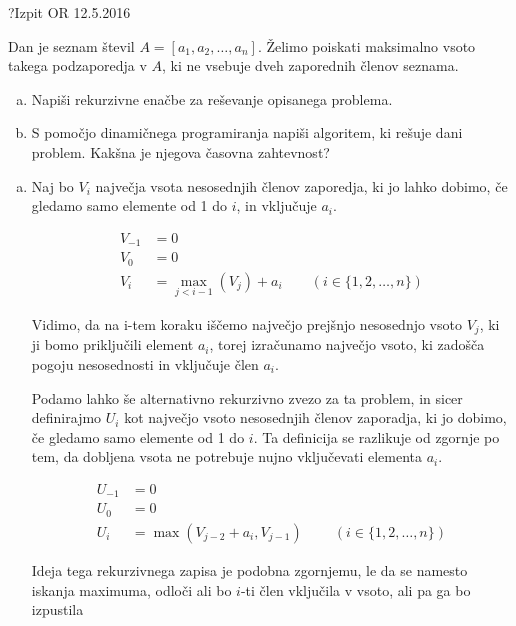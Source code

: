 \begin{naloga}{?}{Izpit OR 12.5.2016}
\begin{vprasanje}
Dan je seznam števil $A = [a_1, a_2, \dots, a_n]$.
Želimo poiskati maksimalno vsoto takega podzaporedja v $A$,
ki ne vsebuje dveh zaporednih členov seznama.

\begin{enumerate}[(a)]
\item Napiši rekurzivne enačbe za reševanje opisanega problema.

\item S pomočjo dinamičnega programiranja napiši algoritem,
ki rešuje dani problem.
Kakšna je njegova časovna zahtevnost?
\end{enumerate}
\end{vprasanje}
\begin{odgovor}

\begin{enumerate}[(a)]

\item Naj bo $V_i$ največja vsota nesosednjih členov zaporedja, ki jo lahko dobimo,
če gledamo samo elemente od 1 do $i$, in vključuje $a_i$.

\begin{align*}
V_{-1} &= 0 \\
V_0 &= 0 \\
V_i &= \max_{j < i - 1}\left(V_j\right) + a_i
\qquad (i \in \{1, 2, \dots, n\})
\end{align*}

Vidimo, da na i-tem koraku iščemo največjo prejšnjo nesosednjo vsoto $V_j$, 
ki ji bomo priključili element $a_i$, torej izračunamo največjo vsoto, 
ki zadošča pogoju nesosednosti in vključuje člen $a_i$.

Podamo lahko še alternativno rekurzivno zvezo za ta problem, in sicer 
definirajmo $U_i$ kot največjo vsoto nesosednjih členov zaporadja, ki jo dobimo, 
če gledamo samo elemente od 1 do $i$.
Ta definicija se razlikuje od zgornje po tem, da dobljena vsota ne potrebuje nujno 
vključevati elementa $a_i$.

\begin{align*}
U_{-1} &= 0 \\
U_0 &= 0 \\
U_i &= \max\left(V_{j - 2} + a_i, V_{j - 1}\right)
\qquad\ \left(i \in \{1, 2, \dots, n\}\right)
\end{align*}

Ideja tega rekurzivnega zapisa je podobna zgornjemu,
le da se namesto iskanja maximuma, odloči ali bo $i$-ti člen vključila v vsoto, 
ali pa ga bo izpustila


\end{enumerate}
\end{odgovor}
\end{naloga}
